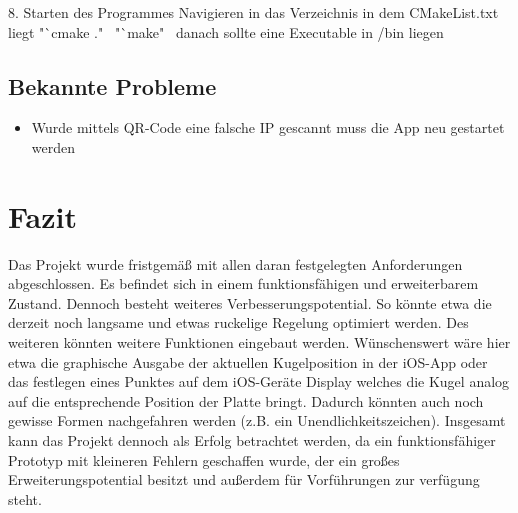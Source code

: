 \documentclass[12pt,a4paper,bibliography=totoc,listof=totoc]{scrartcl}
\begin{document}
8. Starten des Programmes  Navigieren in das Verzeichnis in dem CMakeList.txt liegt  "`cmake ."\  "`make"\  danach sollte eine Executable in /bin liegen 


\subsection{Bekannte Probleme}
\begin{itemize}
    \item Wurde mittels QR-Code eine falsche IP gescannt muss die App neu gestartet werden\,
\end {itemize}


\pagebreak
\section{Fazit}
Das Projekt wurde fristgemäß mit allen daran festgelegten Anforderungen abgeschlossen. Es befindet sich in einem 
funktionsfähigen und erweiterbarem Zustand. Dennoch besteht weiteres Verbesserungspotential. So könnte etwa die 
derzeit noch langsame und etwas ruckelige Regelung optimiert werden. Des weiteren könnten weitere Funktionen eingebaut werden. 
Wünschenswert wäre hier etwa die graphische Ausgabe der aktuellen Kugelposition in der iOS-App oder das festlegen eines Punktes auf
dem iOS-Geräte Display welches die Kugel analog auf die entsprechende Position der Platte bringt. Dadurch könnten auch noch gewisse 
Formen nachgefahren werden (z.B. ein Unendlichkeitszeichen).
\newline
Insgesamt kann das Projekt dennoch als Erfolg betrachtet werden, da ein funktionsfähiger Prototyp mit kleineren Fehlern geschaffen wurde, 
der ein großes Erweiterungspotential besitzt und außerdem für Vorführungen zur verfügung steht.

\pagebreak



\setcounter{page}{1}
\end{document}
